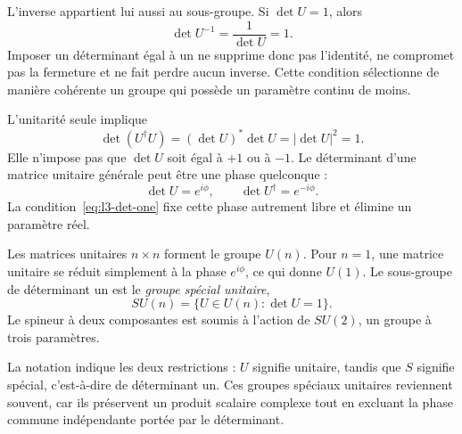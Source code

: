 L’inverse appartient lui aussi au sous-groupe. Si \(\det U=1\), alors
\begin{equation}
\det U^{-1}=\frac{1}{\det U}=1.
\end{equation}
Imposer un déterminant égal à un ne supprime donc pas l’identité, ne compromet pas la fermeture et ne fait perdre aucun inverse. Cette condition sélectionne de manière cohérente un groupe qui possède un paramètre continu de moins.

L’unitarité seule implique
\begin{equation}
\det(U^\dagger U)=
(\det U)^*\det U
=|\det U|^2=1.
\end{equation}
Elle n’impose pas que \(\det U\) soit égal à \(+1\) ou à \(-1\). Le déterminant d’une matrice unitaire générale peut être une phase quelconque :
\begin{equation}
\det U=e^{i\phi},
\qquad
\det U^\dagger=e^{-i\phi}.
\end{equation}
La condition~\eqref{eq:l3-det-one} fixe cette phase autrement libre et élimine un paramètre réel.

\begin{classroomqa}\end{classroomqa}

Les matrices unitaires \(n\times n\) forment le groupe \(U(n)\). Pour \(n=1\), une matrice unitaire se réduit simplement à la phase \(e^{i\phi}\), ce qui donne \(U(1)\). Le sous-groupe de déterminant un est le \emph{groupe spécial unitaire},
\begin{equation}
SU(n)=\{U\in U(n):\det U=1\}.
\end{equation}
Le spineur à deux composantes est soumis à l’action de \(SU(2)\), un groupe à trois paramètres.

La notation indique les deux restrictions : \(U\) signifie unitaire, tandis que \(S\) signifie spécial, c’est-à-dire de déterminant un. Ces groupes spéciaux unitaires reviennent souvent, car ils préservent un produit scalaire complexe tout en excluant la phase commune indépendante portée par le déterminant.

